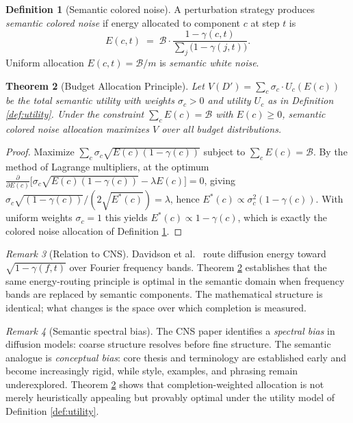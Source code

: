 \documentclass[12pt, a4paper]{article}
\theoremstyle{plain}
\newtheorem{theorem}{Theorem}[section]
\theoremstyle{definition}
\newtheorem{definition}[theorem]{Definition}
\theoremstyle{remark}
\newtheorem{remark}[theorem]{Remark}
\begin{document}
\begin{definition}[Semantic colored noise]
\label{def:colorednoise}
A perturbation strategy produces \emph{semantic colored noise} if energy
allocated to component $c$ at step $t$ is
\[
   E(c, t) \;=\; \mathcal{B} \cdot
   \frac{1 - \gamma(c, t)}{\displaystyle\sum_j \bigl(1 - \gamma(j, t)\bigr)}.
\]
Uniform allocation $E(c, t) = \mathcal{B}/m$ is \emph{semantic white noise}.
\end{definition}

\begin{theorem}[Budget Allocation Principle]
\label{thm:allocation}
Let $V(D') = \sum_c \sigma_c \cdot U_c(E(c))$ be the total semantic utility
with weights $\sigma_c > 0$ and utility $U_c$ as in Definition \ref{def:utility}.
Under the constraint $\sum_c E(c) = \mathcal{B}$ with $E(c) \ge 0$, semantic
colored noise allocation maximizes $V$ over all budget distributions.
\end{theorem}

\begin{proof}
Maximize $\sum_c \sigma_c \sqrt{E(c)(1-\gamma(c))}$ subject to
$\sum_c E(c) = \mathcal{B}$.  By the method of Lagrange multipliers, at the
optimum $\frac{\partial}{\partial E(c)} \bigl[\sigma_c \sqrt{E(c)(1-\gamma(c))}
- \lambda E(c)\bigr] = 0$, giving
$\sigma_c \sqrt{(1-\gamma(c))} / (2\sqrt{E^*(c)}) = \lambda$, hence
$E^*(c) \propto \sigma_c^2(1-\gamma(c))$.  With uniform weights $\sigma_c = 1$
this yields $E^*(c) \propto 1-\gamma(c)$, which is exactly the colored noise
allocation of Definition \ref{def:colorednoise}.
\end{proof}

\begin{remark}[Relation to CNS]
Davidson et al.\ \cite{davidson2026colorednoisediffusionsampling} route
diffusion energy toward $\sqrt{1-\gamma(f,t)}$ over Fourier frequency bands.
Theorem \ref{thm:allocation} establishes that the same energy-routing principle
is optimal in the semantic domain when frequency bands are replaced by semantic
components.  The mathematical structure is identical; what changes is the space
over which completion is measured.
\end{remark}

\begin{remark}[Semantic spectral bias]
The CNS paper \cite{davidson2026colorednoisediffusionsampling} identifies a
\emph{spectral bias} in diffusion models: coarse structure resolves before fine
structure.  The semantic analogue is \emph{conceptual bias}: core thesis and
terminology are established early and become increasingly rigid, while style,
examples, and phrasing remain underexplored.  Theorem \ref{thm:allocation}
shows that completion-weighted allocation is not merely heuristically appealing
but provably optimal under the utility model of Definition \ref{def:utility}.
\end{remark}
\end{document}
